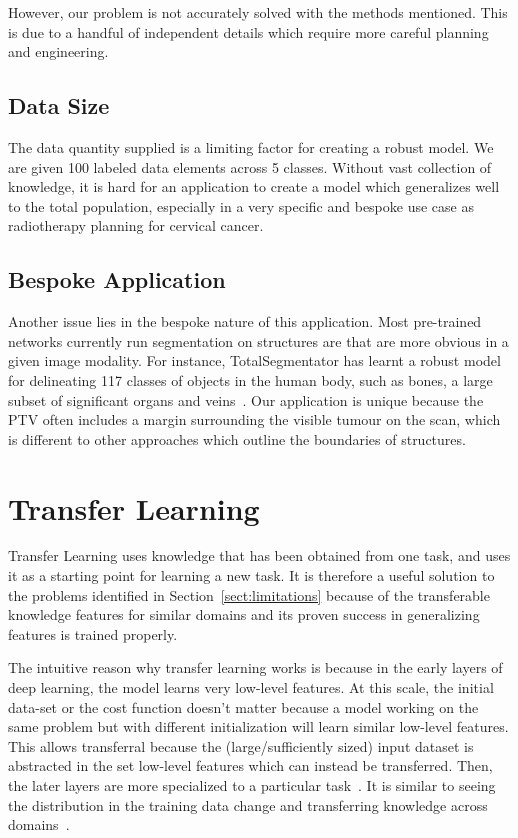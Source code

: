 \documentclass[12pt,twoside]{report}
\begin{document}
However, our problem is not accurately solved with the methods mentioned. This is due to a handful of independent details which require more careful planning and engineering.

\subsection{Data Size}\label{sect:solving-the-problem-data-size}

The data quantity supplied is a limiting factor for creating a robust model. We are given 100 labeled data elements across 5 classes. Without vast collection of knowledge, it is hard for an application to create a model which generalizes well to the total population, especially in a very specific and bespoke use case as radiotherapy planning for cervical cancer.

\subsection{Bespoke Application}\label{sect:solving-the-problem-bespoke-application}

Another issue lies in the bespoke nature of this application. Most pre-trained networks currently run segmentation on structures are that are more obvious in a given image modality. For instance, TotalSegmentator has learnt a robust model for delineating 117 classes of objects in the human body, such as bones, a large subset of significant organs and veins~\cite{totalsegmentor-git}. Our application is unique because the PTV often includes a margin surrounding the visible tumour on the scan, which is different to other approaches which outline the boundaries of structures.

\section{Transfer Learning}\label{sect:transfer-learning}

Transfer Learning uses knowledge that has been obtained from one task, and uses it as a starting point for learning a new task. It is therefore a useful solution to the problems identified in Section~\ref{sect:limitations} because of the transferable knowledge features for similar domains  and its proven success in generalizing features is trained properly.

The intuitive reason why transfer learning works is because in the early layers of deep learning, the model learns very low-level features. At this scale, the initial data-set or the cost function doesn't matter because a model working on the same problem but with different initialization will learn similar low-level features. This allows transferral because the (large/sufficiently sized) input dataset is abstracted in the set low-level features which can instead be transferred. Then, the later layers are more specialized to a particular task~\cite{deep-learning-book}. It is similar to seeing the distribution in the training data change and transferring knowledge across domains~\cite{survey-on-transfer-learning}.
\end{document}
